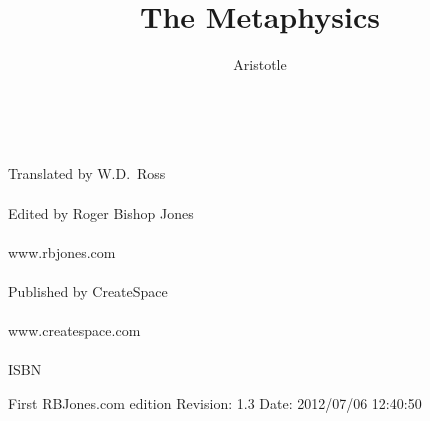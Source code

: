 \newcommand{\Alpha}{A}
\newcommand{\Beta}{B}
\newcommand{\Epsilon}{E}
\newcommand{\Zeta}{Z}
\newcommand{\Tau}{T}
\newcommand{\Eta}{H}
\newcommand{\Iota}{I}
\newcommand{\Kappa}{K}
\newcommand{\Mu}{M}
\newcommand{\Nu}{N}

\newcommand{\dq}{\texttt{"}}


\title{The Metaphysics}
\author{Aristotle}



\renewcommand{\thechapter}{Book \arabic{chapter}}
\renewcommand{\thesection}{Part \arabic{section}}

\addtolength{\cftchapnumwidth}{3em}
\addtolength{\cftsecnumwidth}{2.5em}
\addtolength{\cftsubsecnumwidth}{0.5em}

\frontmatter

\begin{titlepage}
\maketitle

\ 
\\

\vfil

\begin{centering}

\vfil


\vfill

Translated by W.D.~Ross\\
\\
Edited by Roger Bishop Jones\\
\\
www.rbjones.com\\
\\
Published by CreateSpace\\
\\
www.createspace.com\\
\\
ISBN

\vfill

{\footnotesize






First RBJones.com edition $ $Revision: 1.3 $ $Date: 2012/07/06 12:40:50 $ $

}%

\end{centering}

\thispagestyle{empty}
\end{titlepage}

